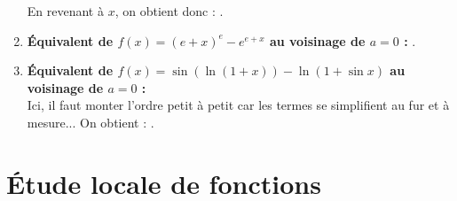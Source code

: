 \documentclass[a4paper, 11pt,reqno]{article}
\begin{document}
\begin{correction}
\begin{enumerate}
		      En revenant \`a $x$, on obtient donc : .
		\item \textbf{\'Equivalent de $f(x)=(e+x)^e -e^{e+x}$ au voisinage de $a=0$ :}
		      .
		\item \textbf{\'Equivalent de $f(x)=\sin{(\ln{(1+x)})}-\ln{(1+\sin{x})}$ au voisinage de $a=0$ :}\\
		      Ici, il faut monter l'ordre petit \`a petit car les termes se simplifient au fur et \`a mesure... On obtient : .
	\end{enumerate}
\end{correction}

\vspace{0.5cm}

\noindent\section{\large{\'Etude locale de fonctions}}
\end{document}
